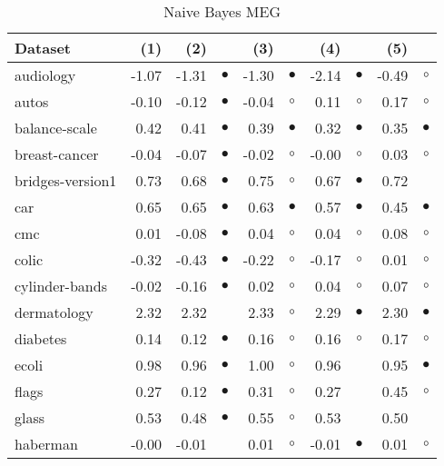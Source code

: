 \begin{table}[H]
\caption{\label{nbmeg}Naive Bayes MEG}
\footnotesize
{\centering \begin{tabular}{lrr@{\hspace{0.1cm}}cr@{\hspace{0.1cm}}cr@{\hspace{0.1cm}}cr@{\hspace{0.1cm}}c}
\\
\hline
Dataset & (1)& (2) & & (3) & & (4) & & (5) & \\
\hline
audiology & -1.07 & -1.31 & $\bullet$ & -1.30 & $\bullet$ & -2.14 & $\bullet$ & -0.49 &    $\circ$\\
autos & -0.10 & -0.12 & $\bullet$ & -0.04 &   $\circ$ &  0.11 &   $\circ$ &  0.17 &    $\circ$\\
balance-scale &  0.42 &  0.41 & $\bullet$ &  0.39 & $\bullet$ &  0.32 & $\bullet$ &  0.35 &  $\bullet$\\
breast-cancer & -0.04 & -0.07 & $\bullet$ & -0.02 &   $\circ$ & -0.00 &   $\circ$ &  0.03 &    $\circ$\\
bridges-version1 &  0.73 &  0.68 & $\bullet$ &  0.75 &   $\circ$ &  0.67 & $\bullet$ &  0.72 &           \\
car &  0.65 &  0.65 & $\bullet$ &  0.63 & $\bullet$ &  0.57 & $\bullet$ &  0.45 &  $\bullet$\\
cmc &  0.01 & -0.08 & $\bullet$ &  0.04 &   $\circ$ &  0.04 &   $\circ$ &  0.08 &    $\circ$\\
colic & -0.32 & -0.43 & $\bullet$ & -0.22 &   $\circ$ & -0.17 &   $\circ$ &  0.01 &    $\circ$\\
cylinder-bands & -0.02 & -0.16 & $\bullet$ &  0.02 &   $\circ$ &  0.04 &   $\circ$ &  0.07 &    $\circ$\\
dermatology &  2.32 &  2.32 &           &  2.33 &   $\circ$ &  2.29 & $\bullet$ &  2.30 &  $\bullet$\\
diabetes &  0.14 &  0.12 & $\bullet$ &  0.16 &   $\circ$ &  0.16 &   $\circ$ &  0.17 &    $\circ$\\
ecoli &  0.98 &  0.96 & $\bullet$ &  1.00 &   $\circ$ &  0.96 &           &  0.95 &  $\bullet$\\
flags &  0.27 &  0.12 & $\bullet$ &  0.31 &   $\circ$ &  0.27 &           &  0.45 &    $\circ$\\
glass &  0.53 &  0.48 & $\bullet$ &  0.55 &   $\circ$ &  0.53 &           &  0.50 &           \\
haberman & -0.00 & -0.01 &           &  0.01 &   $\circ$ & -0.01 & $\bullet$ &  0.01 &    $\circ$\\

\end{tabular}}
\end{table}
